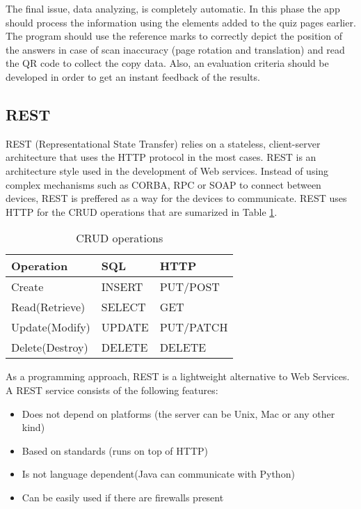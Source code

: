 The final issue, data analyzing, is completely automatic. In this phase the app should process 
the information using the elements added to the quiz pages earlier. The program should use the 
reference marks to correctly depict the position of the answers in case of scan inaccuracy (page rotation and translation) and read the QR code to collect the copy data. Also, an evaluation criteria should be developed 
in order to get an instant feedback of the results.

\subsection{REST}
REST (Representational State Transfer) relies on a stateless, client-server architecture that uses the HTTP protocol in the most cases.
REST is an architecture style used in the development of Web services. Instead of using complex mechanisms such as CORBA, RPC or SOAP to connect between devices, REST is preffered as a way for the devices to communicate.
REST uses HTTP for the CRUD operations that are sumarized in Table \ref{crud_operations}.
\begin{table}[ht!]
\centering
\caption{CRUD operations}
{
\renewcommand{\arraystretch}{1.25}
\begin{tabular}{ lll }

  Operation & SQL & HTTP \\ \hline
  Create &  INSERT & PUT/POST \\
  Read(Retrieve) & SELECT & GET \\
  Update(Modify) & UPDATE & PUT/PATCH \\
  Delete(Destroy) & DELETE & DELETE \\

\end{tabular}
}
\label{crud_operations}
\end{table}

As a programming approach, REST is a lightweight alternative to Web Services.
A REST service consists of the following features:
\begin{itemize}
  \item Does not depend on platforms (the server can be Unix, Mac or any other kind)
  \item Based on standards (runs on top of HTTP)
  \item Is not language dependent(Java can communicate with Python)
  \item Can be easily used if there are firewalls present
\end{itemize}

